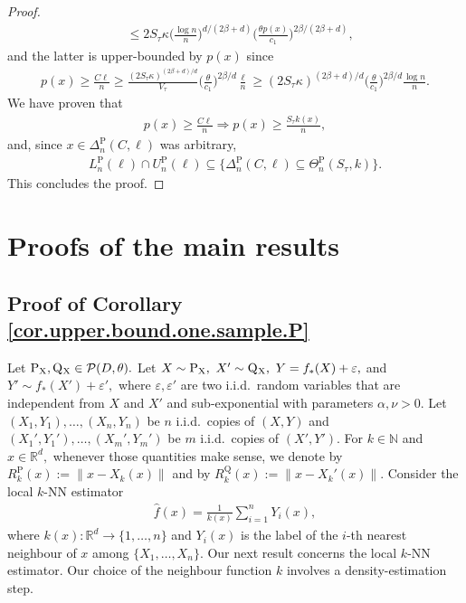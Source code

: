 \documentclass[10pt]{article}
\newcommand{\eps}{\varepsilon}
\newcommand{\mP}{\mathcal{P}}
\newcommand{\NN}{\mathbb{N}}
\newcommand{\RR}{\mathbb{R}}
\renewcommand{\P}{\operatorname{P}}
\newcommand{\Q}{\operatorname{Q}}
\renewcommand{\k}{\kappa}
\newcommand{\wh}{\widehat}
\newcommand{\sX}{\mathrm{X}}
\begin{document}
\begin{proof}
\begin{align*}
    &\leq 2S_\tau\k \bigg(\frac{\log n}{n}\bigg)^{d/(2\beta + d)}\bigg(\frac{\theta p(x)}{c_1}\bigg)^{2\beta/(2\beta + d)},
\end{align*}
and the latter is upper-bounded by $p(x)$ since
\begin{align*}
    p(x) \geq \frac{C\ell}{n} \geq \frac{(2S_\tau\k)^{(2\beta + d)/d}}{V_\tau}\bigg(\frac{\theta}{c_1}\bigg)^{2\beta/d}\frac{\ell}{n} \geq (2S_\tau\k)^{(2\beta + d)/d}\bigg(\frac{\theta}{c_1}\bigg)^{2\beta/d}\frac{\log n}{n}.
\end{align*}
We have proven that
\begin{align*}
    p(x) \geq \frac {C\ell}{n} \Rightarrow p(x) \geq \frac{S_\tau k(x)}{n},
\end{align*}
and, since $x \in \Delta_n^{\P}(C, \ell)$ was arbitrary,
\begin{align*}
    L_n^{\P}(\ell)\cap U_n^{\P}(\ell) \subseteq \Bigg\{\Delta_n^{\P}(C, \ell) \subseteq \Theta_n^{\P}(S_\tau, k)\Bigg\}.
\end{align*}
This concludes the proof.
\end{proof}

\section{Proofs of the main results}
\label{app.main.results}

\subsection{Proof of Corollary \ref{cor.upper.bound.one.sample.P}}

Let $\P_{\sX}, \Q\mathstrut_{\!\sX} \in \mP(D, \theta).$ Let $X \sim \P_{\sX},\ X' \sim \Q\mathstrut_{\!\sX},\ Y = f_*(X) + \eps,$ and $Y' \sim f_*(X') + \eps',$ where $\eps, \eps'$ are two i.i.d.\ random variables that are independent from $X$ and $X'$ and sub-exponential with parameters $\alpha, \nu > 0.$ Let $(X_1, Y_1), \dots, (X_n, Y_n)$ be $n$ i.i.d.\ copies of $(X, Y)$ and $(X_1', Y_1'), \dots, (X_m', Y_m')$ be $m$ i.i.d.\ copies of $(X', Y').$ For $k \in \NN$ and $x \in \RR^d,$ whenever those quantities make sense, we denote by $R_k^{\P}(x) := \|x - X_k(x)\|$ and by $R_k^{\Q}(x) := \|x - X_k'(x)\|.$ Consider the local $k$-NN estimator
\begin{align}
    \label{eq.weighted.knn}
    \wh f(x) = \frac{1}{k(x)} \sum_{i=1}^n Y_i(x),
\end{align}
where $k(x) \colon \RR^d \to \{1, \dots, n\}$ and $Y_i(x)$ is the label of the $i$-th nearest neighbour of $x$ among $\{X_1, \dots, X_n\}.$ Our next result concerns the local $k$-NN estimator. Our choice of the neighbour function $k$ involves a density-estimation step. 
\end{document}
